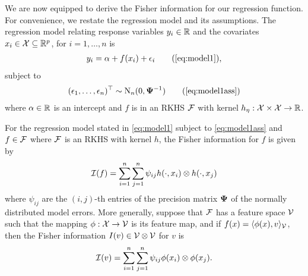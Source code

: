 We are now equipped to derive the Fisher information for our regression function.
For convenience, we restate the regression model and its assumptions.
The regression model relating response variables $y_i \in \mathbb{R}$ and the covariates $x_i \in {\mathcal X} \subseteq \mathbb{R}^p$, for $i=1,\dots,n$ is
\begin{align}
  y_i = \alpha + f(x_i) + \epsilon_i \tag{\ref{eq:model1}},
\end{align}
subject to
\begin{align}
  (\epsilon_1, \dots, \epsilon_n)^\top \sim \N_n(0, \bPsi^{-1}) \tag{\ref{eq:model1ass}}
\end{align}
where $\alpha \in \mathbb{R}$ is an intercept and $f$ is in an RKHS ${\mathcal F}$ with kernel $h_\eta:{\mathcal X} \times {\mathcal X} \to \mathbb{R}$.

\begin{lemma}\label{thm:fisherregf}
  For the regression model stated in \eqref{eq:model1} subject to \eqref{eq:model1ass} and $f \in {\mathcal F}$ where ${\mathcal F}$ is an RKHS with kernel $h$, the Fisher information for $f$ is given by
  \[
    {\mathcal I}(f) = \sum_{i=1}^n\sum_{j=1}^n \psi_{ij} h(\cdot,x_i) \otimes h(\cdot,x_j)
  \]
  where $\psi_{ij}$ are the $(i,j)$-th entries of the precision matrix ${\bm\Psi}$ of the normally distributed model errors.
  More generally, suppose that ${\mathcal F}$ has a feature space ${\mathcal V}$ such that the mapping $\phi:{\mathcal X} \to {\mathcal V}$ is its feature map, and if $f(x)=\langle\phi(x),v\rangle_{\mathcal V}$, then the Fisher information $I(v) \in {\mathcal V} \otimes {\mathcal V}$ for $v$ is
  \[
    {\mathcal I}(v) = \sum_{i=1}^n\sum_{j=1}^n \psi_{ij} \phi(x_i) \otimes \phi(x_j).
  \]
\end{lemma}


